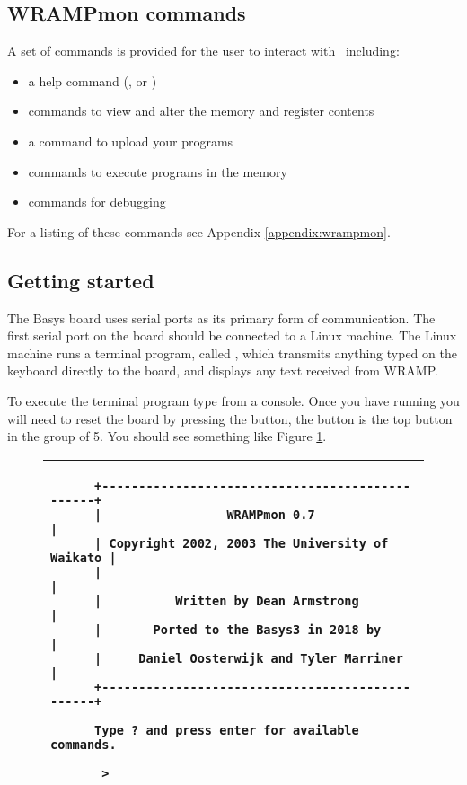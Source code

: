 \subsection{WRAMPmon commands}
A set of commands is provided for the user to interact with \WRAMPmon\
including:

\begin{itemize}
\item a help command (, or )
\item commands to view and alter the memory and register contents
\item a command to upload your programs
\item commands to execute programs in the memory
\item commands for debugging
\end{itemize}

For a listing of these commands see Appendix \ref{appendix:wrampmon}.

\subsection{Getting started}
The Basys board uses serial ports as its primary form of communication.
The first serial port on the board should be connected to a Linux
machine. The Linux machine runs a terminal program, called
, which transmits anything typed on the keyboard
directly to the board, and displays any text received from WRAMP.

To execute the terminal program type  from a console.
Once you have \src{remote} running you will need to reset the
board by pressing the  button, the \src{RESET} button is the
top button in the group of 5. 
You should see something like Figure \ref{wrampmon}.

\begin{figure}[h]
\begin{center}
\begin{tabular}{|p{15cm}|}
\hline
\begin{verbatim}
      +------------------------------------------------+
      |                 WRAMPmon 0.7                   |
      | Copyright 2002, 2003 The University of Waikato |
      |                                                |
      |          Written by Dean Armstrong             |
      |       Ported to the Basys3 in 2018 by          |
      |     Daniel Oosterwijk and Tyler Marriner       |
      +------------------------------------------------+
      
      Type ? and press enter for available commands.
      
       > 
\end{verbatim}
\\
\hline
\end{tabular}
\end{center}

\caption{\WRAMPmon}
\label{wrampmon}
\end{figure}

